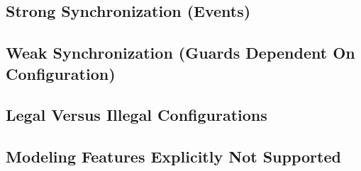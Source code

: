 \subsection{Strong Synchronization (Events)}
\label{smfs0:sssy0}


\subsection{Weak Synchronization (Guards Dependent On Configuration)}
\label{smfs0:swsy0}


\subsection{Legal Versus Illegal Configurations}
\label{smfs0:slvi0}


\subsection{Modeling Features Explicitly Not Supported}
\label{smfs0:smen0}


